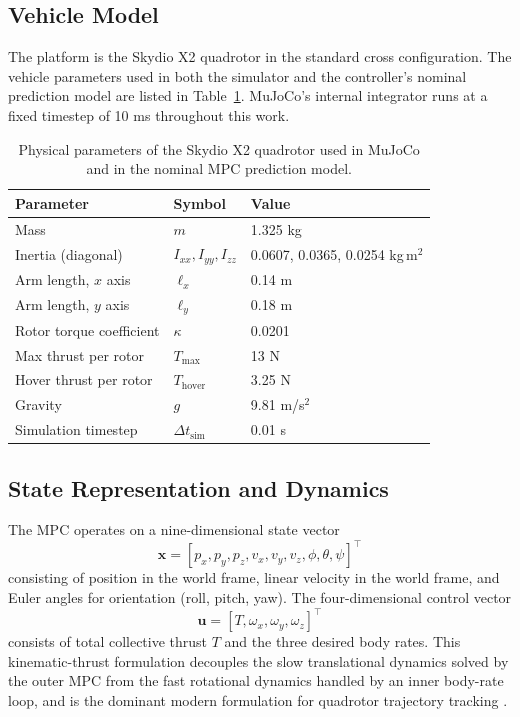 \documentclass[conference]{IEEEtran}
\begin{document}
\subsection{Vehicle Model}
The platform is the Skydio X2 quadrotor in the standard cross configuration. The vehicle parameters used in both the simulator and the controller's nominal prediction model are listed in Table~\ref{tab:params}. MuJoCo's internal integrator runs at a fixed timestep of 10 ms throughout this work.
\begin{table}[t]
\centering
\caption{Physical parameters of the Skydio X2 quadrotor used in MuJoCo and in the nominal MPC prediction model.}
\label{tab:params}
\begin{tabular}{lll}
\toprule
Parameter & Symbol & Value \\
\midrule
Mass & $m$ & 1.325 kg \\
Inertia (diagonal) & $I_{xx}, I_{yy}, I_{zz}$ & 0.0607, 0.0365, 0.0254 kg\,m$^2$ \\
Arm length, $x$ axis & $\ell_x$ & 0.14 m \\
Arm length, $y$ axis & $\ell_y$ & 0.18 m \\
Rotor torque coefficient & $\kappa$ & 0.0201 \\
Max thrust per rotor & $T_{\max}$ & 13 N \\
Hover thrust per rotor & $T_{\text{hover}}$ & 3.25 N \\
Gravity & $g$ & 9.81 m/s$^2$ \\
Simulation timestep & $\Delta t_{\text{sim}}$ & 0.01 s \\
\bottomrule
\end{tabular}
\end{table}

\subsection{State Representation and Dynamics}
The MPC operates on a nine-dimensional state vector
\begin{equation}
\mathbf{x} = [p_x, p_y, p_z, v_x, v_y, v_z, \phi, \theta, \psi]^\top
\end{equation}
consisting of position in the world frame, linear velocity in the world frame, and Euler angles for orientation (roll, pitch, yaw). The four-dimensional control vector
\begin{equation}
\mathbf{u} = [T, \omega_x, \omega_y, \omega_z]^\top
\end{equation}
consists of total collective thrust $T$ and the three desired body rates. This kinematic-thrust formulation decouples the slow translational dynamics solved by the outer MPC from the fast rotational dynamics handled by an inner body-rate loop, and is the dominant modern formulation for quadrotor trajectory tracking \cite{faessler2018differential, sun2022comparative}.
\end{document}
